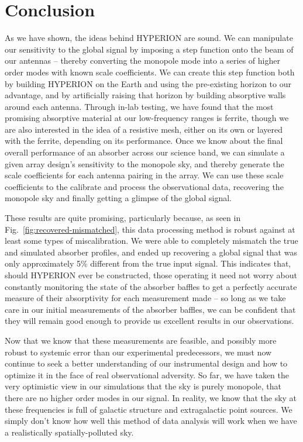 \chapter{Conclusion}

As we have shown, the ideas behind HYPERION are sound. We can manipulate our 
sensitivity to the global signal by imposing a step function onto the beam of 
our antennas -- thereby converting the monopole mode into a series of higher 
order modes with known scale coefficients. We can create this step function 
both by building HYPERION on the Earth and using the pre-existing horizon to 
our advantage, and by artificially raising that horizon by building absorptive 
walls around each antenna. Through in-lab testing, we have found that the most 
promising absorptive material at our low-frequency ranges is ferrite, though we 
are also interested in the idea of a resistive mesh, either on its own or 
layered with the ferrite, depending on its performance. Once we know about the 
final overall performance of an absorber across our science band, we can 
simulate a given array design's sensitivity to the monopole sky, and thereby 
generate the scale coefficients for each antenna pairing in the array. We can 
use these scale coefficients to the calibrate and process the observational 
data, recovering the monopole sky and finally getting a glimpse of the global 
signal.

These results are quite promising, particularly because, as seen in 
Fig.~\ref{fig:recovered-mismatched}, this data processing method is robust 
against at least some types of miscalibration. We were able to completely 
mismatch the true and simulated absorber profiles, and ended up recovering a 
global signal that was only approximately 5\% different from the true input 
signal. This indicates that, should HYPERION ever be constructed, those 
operating it need not worry about constantly monitoring the state of the 
absorber baffles to get a perfectly accurate measure of their absorptivity for 
each measurement made -- so long as we take care in our initial measurements of 
the absorber baffles, we can be confident that they will remain good enough to 
provide us excellent results in our observations.

Now that we know that these measurements are feasible, and possibly more robust 
to systemic error than our experimental predecessors, we must now continue to 
seek a better understanding of our instrumental design and how to optimize it 
in the face of real observational adversity. So far, we have taken the very 
optimistic view in our simulations that the sky is purely monopole, that there 
are no higher order modes in our signal. In reality, we know that the sky at 
these frequencies is full of galactic structure and extragalactic point 
sources. We simply don't know how well this method of data analysis will work 
when we have a realistically spatially-polluted sky.

